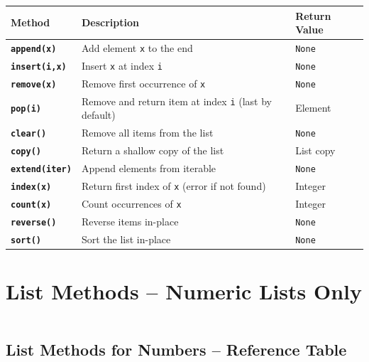 \documentclass[a4paper,11pt]{article}
\begin{document}
	\begin{tabular}{>{\bfseries}p{3.5cm} p{6cm} p{3.5cm}}
		\toprule
		Method & Description & Return Value \\
		\midrule
		
		\texttt{append(x)}   & Add element \texttt{x} to the end & \texttt{None} \\
		\texttt{insert(i,x)} & Insert \texttt{x} at index \texttt{i} & \texttt{None} \\
		\texttt{remove(x)}   & Remove first occurrence of \texttt{x} & \texttt{None} \\
		\texttt{pop(i)}      & Remove and return item at index \texttt{i} (last by default) & Element \\
		\texttt{clear()}     & Remove all items from the list & \texttt{None} \\
		\texttt{copy()}      & Return a shallow copy of the list & List copy \\
		\texttt{extend(iter)}& Append elements from iterable & \texttt{None} \\
		\texttt{index(x)}    & Return first index of \texttt{x} (error if not found) & Integer \\
		\texttt{count(x)}    & Count occurrences of \texttt{x} & Integer \\
		\texttt{reverse()}   & Reverse items in-place & \texttt{None} \\
		\texttt{sort()}      & Sort the list in-place & \texttt{None} \\
		
		\bottomrule
	\end{tabular}
	
	
		\newpage
	\section{List Methods – Numeric Lists Only}
	\inputminted{python}{Python_Files/list_methods_numeric.py}
	
	\vspace{1em}
	\subsection*{List Methods for Numbers – Reference Table}
	
\end{document}
